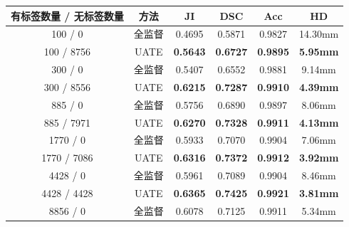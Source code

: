 \begin{table}[!ht]
    \centering
    \begin{tabular}{cccccc}
        \toprule
        有标签数量 / 无标签数量 & 方法 & JI &  DSC & Acc & HD \\
        \hline
        100 / 0 & 全监督 & 0.4695 & 0.5871 & 0.9827 & 14.30mm \\
        100 / 8756 & UATE & \textbf{0.5643} & \textbf{0.6727} & \textbf{0.9895} & \textbf{5.95mm}\\
        \hline
        300 / 0 & 全监督 & 0.5407 & 0.6552 & 0.9881 &  9.14mm\\
        300 / 8556 & UATE & \textbf{0.6215} & \textbf{0.7287} & \textbf{0.9910} & \textbf{4.39mm}\\
        \hline
        885 / 0 & 全监督 & 0.5756 & 0.6890 & 0.9897 & 8.06mm\\
        885 / 7971 & UATE & \textbf{0.6270} & \textbf{0.7328} & \textbf{0.9911} & \textbf{4.13mm}\\
        \hline
        1770 / 0 & 全监督 & 0.5933 & 0.7070 & 0.9904 & 7.06mm\\
        1770 / 7086 & UATE & \textbf{0.6316} & \textbf{0.7372} & \textbf{0.9912} & \textbf{3.92mm}\\
        \hline
        4428 / 0 & 全监督 & 0.5961 & 0.7089 & 0.9904 & 8.46mm\\
        4428 / 4428 & UATE & \textbf{0.6365} & \textbf{0.7425} & \textbf{0.9921} & \textbf{3.81mm}\\
        \hline
        8856 / 0 & 全监督 & 0.6078 & 0.7125 & 0.9911 & 5.34mm\\
        \bottomrule
    \end{tabular}
    \label{tab:uate_result_diff_sample_data}
\end{table}

